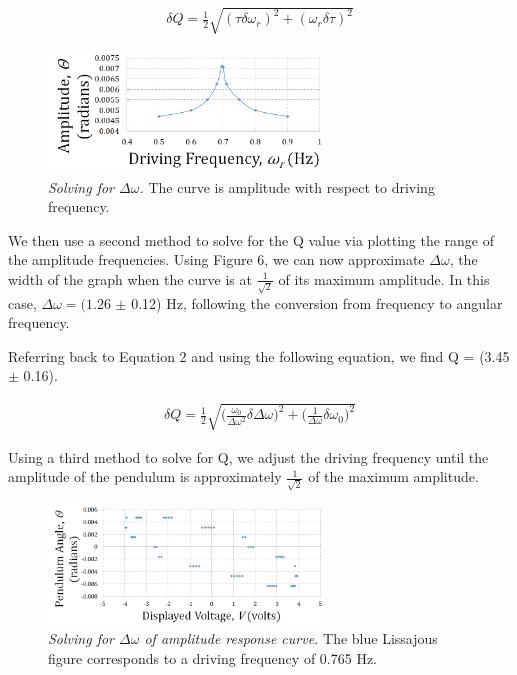 \documentclass[twoside,twocolumn]{article}
\begin{document}
\begin{align}
\delta Q = \frac{1}{2}\sqrt{(\tau \delta \omega_r)^2 + (\omega_r \delta \tau)^2}
\end{align}

\begin{figure}[!htbp]
    \centering
    \includegraphics[width=2.9in]{Amplitude.png}
    \caption{\textit{Solving for $\Delta \omega$.} The curve is amplitude with respect to driving frequency.}
\end{figure}

\noindent We then use a second method to solve for the Q value via plotting the range of the amplitude frequencies.
\noindent Using Figure 6, we can now approximate $\Delta \omega$, the width of the graph when the curve is at $\frac{1}{\sqrt{2}}$ of its maximum amplitude. In this case, $\Delta \omega = (1.26$ $\pm$ 0.12) Hz, following the conversion from frequency to angular frequency.

\noindent Referring back to Equation 2 and using the following equation, we find Q = (3.45 $\pm$ 0.16).

\begin{align}
\delta Q = \frac{1}{2}\sqrt{\bigg (\frac{\omega_0}{\Delta \omega^2}\delta \Delta \omega)^2 + \bigg(\frac{1}{\Delta \omega} \delta \omega_0 \bigg)^2}
\end{align}

\noindent Using a third method to solve for Q, we adjust the driving frequency until the amplitude of the pendulum is approximately $\frac{1}{\sqrt{2}}$ of the maximum amplitude.

\begin{figure}[!htbp]
    \centering
    \includegraphics[width=2.9in]{ECAbove.png}
    \caption{\textit{Solving for $\Delta \omega$ of amplitude response curve.} The blue Lissajous figure corresponds to a driving frequency of 0.765 Hz.}
\end{figure}
\end{document}
